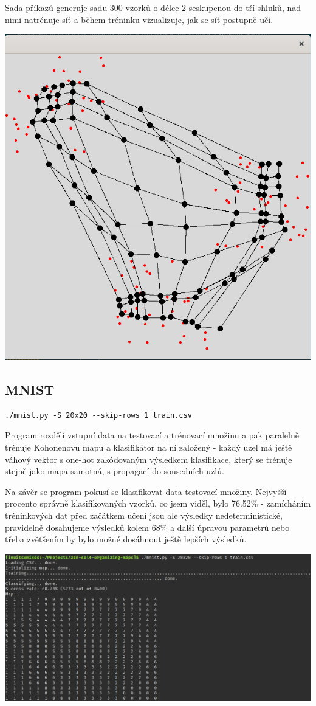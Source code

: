 \documentclass[11pt]{article}
\begin{document}
Sada příkazů generuje sadu 300 vzorků o délce 2 seskupenou do tří shluků, nad
nimi natrénuje síť a během tréninku vizualizuje, jak se síť postupně učí.

\begin{center}
\includegraphics[width=.7\linewidth]{img/Screenshot from 2019-12-19 11-28-01.png}
\end{center}

\subsection{MNIST}
\label{sec:org3d534b8}
\begin{verbatim}
./mnist.py -S 20x20 --skip-rows 1 train.csv
\end{verbatim}

Program rozdělí vstupní data na testovací a trénovací množinu a pak paralelně
trénuje Kohonenovu mapu a klasifikátor na ní založený - každý uzel má ještě
váhový vektor s one-hot zakódovaným výsledkem klasifikace, který se trénuje
stejně jako mapa samotná, s propagací do sousedních uzlů.

Na závěr se program pokusí se klasifikovat data testovací množiny. Nejvyšší
procento správně klasifikovaných vzorků, co jsem viděl, bylo 76.52\% - zamícháním
tréninkových dat před začátkem učení jsou ale výsledky nedeterministické,
pravidelně dosahujeme výsledků kolem 68\% a další úpravou parametrů nebo třeba
zvětšením by bylo možné dosáhnout ještě lepších výsledků.

\begin{center}
\includegraphics[width=.7\linewidth]{img/Screenshot from 2019-12-19 11-28-55.png}
\end{center}
\end{document}
